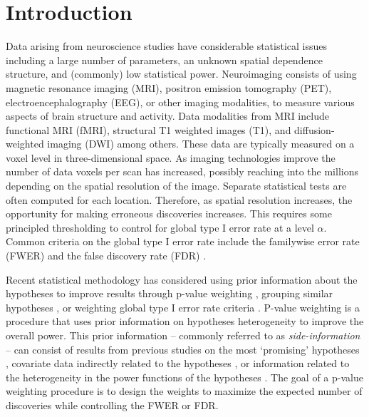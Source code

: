 \documentclass[bimj,fleqn]{w-art}
\theoremstyle{plain}
\theoremstyle{definition}
\begin{document}
\section{Introduction}
\label{sec1}

Data arising from neuroscience studies  have considerable statistical issues including a large number of parameters, an unknown spatial dependence structure, and (commonly) low statistical power. Neuroimaging consists of using magnetic resonance imaging (MRI), positron emission tomography (PET), electroencephalography (EEG), or other imaging modalities, to measure various aspects of brain structure and activity.  Data modalities from MRI include functional MRI (fMRI), structural T1 weighted images (T1), and diffusion-weighted imaging (DWI) among others.  These data are typically measured on a voxel level in three-dimensional space.  As imaging technologies improve the number of data voxels per scan has increased, possibly reaching into the millions depending on the spatial resolution of the image. Separate statistical tests are often computed for each location. Therefore, as spatial resolution increases, the opportunity for making erroneous discoveries increases.  This requires some principled thresholding to control for global type I error rate at a level $\alpha$.  Common criteria on the global type I error rate include the familywise error rate (FWER) \citep{Tuk94,NicHol02} and the false discovery rate (FDR) \citep{Benjamini1995}.  

Recent statistical methodology has considered using prior information about the hypotheses to improve results through p-value weighting \citep{Gen06, Roeder2009, Pena2011, Habiger2017, Ignatiadis2021, Lihua2018, Xianyang20}, grouping similar hypotheses \citep{Cai2009, Hu2010,Ignatiadis2016}, or weighting global type I error rate criteria \citep{BenHoc97,BenCoh17,Basetal18}. P-value weighting is a procedure that uses prior information on hypotheses heterogeneity to improve the overall power.  This prior information  -- commonly referred to as \textit{side-information} -- can consist of results from previous studies on the most `promising' hypotheses \citep{LiBar17,LiBar19,Lihua2018}, covariate data indirectly related to the hypotheses \citep{Ignatiadis2021}, or information related to the heterogeneity in the power functions of the hypotheses \citep{Pena2011,Habiger2017}.  The goal of a p-value weighting procedure is to design the weights to maximize the expected number of discoveries while controlling the FWER or FDR.  
\end{document}
